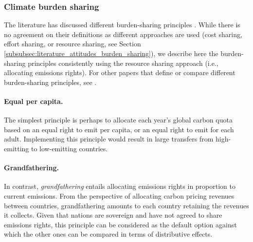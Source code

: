 
\subsubsection{Climate burden sharing}\label{subsubsec:literature_burden_sharing} 

The literature has discussed different burden-sharing principles \citep{ringius_burden_2002}. While there is no  agreement on their definitions as different approaches are used (cost sharing, effort sharing, or resource sharing, see Section \ref{subsubsec:literature_attitudes_burden_sharing}), we describe here the burden-sharing principles consistently using the resource sharing approach (i.e., allocating emissions rights). For other papers that define or compare different burden-sharing principles, see \citet{leimbach_burden_2019,zhou_carbon_2016,vaillancourt_equity_2004}. %

\paragraph{Equal per capita.} The simplest principle is perhaps to allocate each year's global carbon quota based on an equal right to emit per capita, or an equal right to emit for each adult. Implementing this principle would result in large transfers from high-emitting to low-emitting countries. 

\paragraph{Grandfathering.} In contrast, \textit{grandfathering} entails allocating emissions rights in proportion to current emissions. From the perspective of allocating carbon pricing revenues between countries, grandfathering amounts to each country retaining the revenues it collects. Given that nations are sovereign and have not agreed to share emissions rights, this principle can be considered as the default option against which the other ones can be compared in terms of distributive effects.

